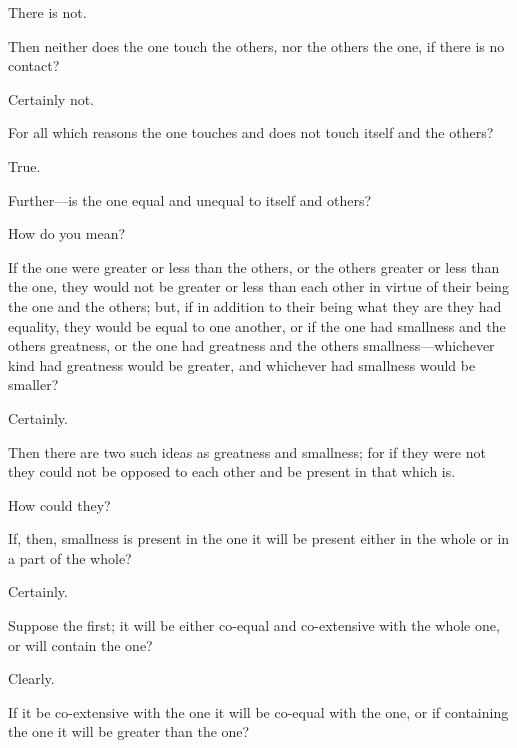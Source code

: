 \documentclass[11pt,letter]{article}
\begin{document}
\par  There is not.

\par  Then neither does the one touch the others, nor the others the one, if there is no contact?

\par  Certainly not.

\par  For all which reasons the one touches and does not touch itself and the others?

\par  True.

\par  Further—is the one equal and unequal to itself and others?

\par  How do you mean?

\par  If the one were greater or less than the others, or the others greater or less than the one, they would not be greater or less than each other in virtue of their being the one and the others; but, if in addition to their being what they are they had equality, they would be equal to one another, or if the one had smallness and the others greatness, or the one had greatness and the others smallness—whichever kind had greatness would be greater, and whichever had smallness would be smaller?

\par  Certainly.

\par  Then there are two such ideas as greatness and smallness; for if they were not they could not be opposed to each other and be present in that which is.

\par  How could they?

\par  If, then, smallness is present in the one it will be present either in the whole or in a part of the whole?

\par  Certainly.

\par  Suppose the first; it will be either co-equal and co-extensive with the whole one, or will contain the one?

\par  Clearly.

\par  If it be co-extensive with the one it will be co-equal with the one, or if containing the one it will be greater than the one?
\end{document}
